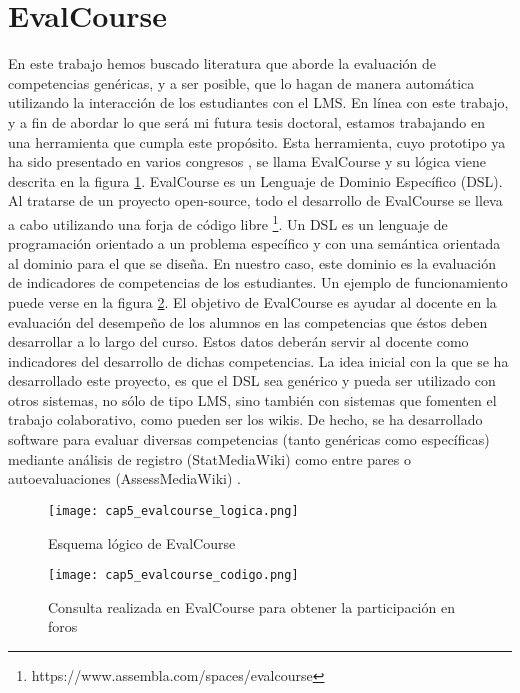 \section{EvalCourse}
En este trabajo hemos buscado literatura que aborde la evaluación de competencias genéricas, y a ser posible, que lo hagan de manera automática utilizando la interacción de los estudiantes con el LMS. En línea con este trabajo, y a fin de abordar lo que será mi futura tesis doctoral, estamos trabajando en una herramienta que cumpla este propósito. Esta herramienta, cuyo prototipo ya ha sido presentado en varios congresos \cite{Balderas:2013,Balderas:2013a}, se llama EvalCourse y su lógica viene descrita en la figura \ref{fig:EvalcourseLogica}. EvalCourse es un Lenguaje de Dominio Específico (DSL). Al tratarse de un proyecto open-source, todo el desarrollo de EvalCourse se lleva a cabo utilizando una forja de código libre \footnote{https://www.assembla.com/spaces/evalcourse}. Un DSL es un lenguaje de programación orientado a un problema específico y con una semántica orientada al dominio para el que se diseña. En nuestro caso, este dominio es la evaluación de indicadores de competencias de los estudiantes. Un ejemplo de funcionamiento puede verse en la figura \ref{fig:EvalCourseCodigo}. El objetivo de EvalCourse es ayudar al docente en la evaluación del desempeño de los alumnos en las competencias que éstos deben desarrollar a lo largo del curso. Estos datos deberán servir al docente como indicadores del desarrollo de dichas competencias. La idea inicial con la que se ha desarrollado este proyecto, es que el DSL sea genérico y pueda ser utilizado con otros sistemas, no sólo de tipo LMS, sino también con sistemas que fomenten el trabajo colaborativo, como pueden ser los wikis. De hecho, se ha desarrollado software para evaluar diversas competencias (tanto genéricas como específicas) mediante análisis de registro (StatMediaWiki) como entre pares o autoevaluaciones (AssessMediaWiki) \cite{Palomo-Duarte:2013}.



\begin{figure}[H]
  \begin{center}
    \texttt{[image: cap5\_evalcourse\_logica.png]}
  \end{center}
  \caption{Esquema lógico de EvalCourse}
  \label{fig:EvalcourseLogica}
\end{figure}


\begin{figure}[H]
  \begin{center}
    \texttt{[image: cap5\_evalcourse\_codigo.png]}
  \end{center}
  \caption{Consulta realizada en EvalCourse para obtener la participación en foros}
  \label{fig:EvalCourseCodigo}
\end{figure}

